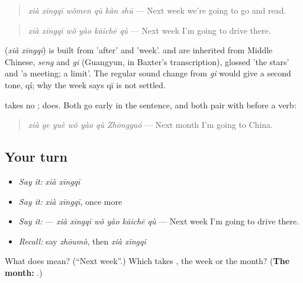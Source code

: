 \begin{quote}
\textbf{} \emph{xià xīngqī wǒmen qù kàn shū} — Next week we're going to go and read.
\end{quote}

\begin{quote}
\textbf{} \emph{xià xīngqī wǒ yào kāichē qù} — Next week I'm going to drive there.
\end{quote}

\begin{cousinweb}
\textbf{} (\emph{xià xīngqī}) is built from  'after' and  'week'.  and  are inherited from Middle Chinese, \emph{seng} and \emph{gi} (Guangyun, in Baxter's transcription), glossed 'the stars' and 'a meeting; a limit'. The regular sound change from \emph{gi} would give a second tone, qí; why the week says qī is not settled.
\end{cousinweb}

\begin{grammarlens}[title={What you've built}]
 takes no ;  does. Both go early in the sentence, and both pair with  before a verb:

\begin{quote}
\textbf{} \emph{xià ge yuè wǒ yào qù Zhōngguó} — Next month I'm going to China.
\end{quote}
\end{grammarlens}

\subsection*{Your turn}
\begin{itemize}
\raggedright
  \item \emph{Say it:} \emph{xià xīngqī}
  \item \emph{Say it:} \emph{xià xīngqī}, once more
  \item \emph{Say it:}  — \emph{xià xīngqī wǒ yào kāichē qù} — Next week I'm going to drive there.
  \item \emph{Recall:} say \emph{zhōumò}, then \emph{xià xīngqī}
\end{itemize}

\begin{tcolorbox}[breakable,colback=teal!4,colframe=teal!35!black,title={Before you move on}]
What does  mean? (\textquotedblleft{}Next week\textquotedblright{}.) Which takes , the week or the month? (\textbf{The month: }.)
\end{tcolorbox}
